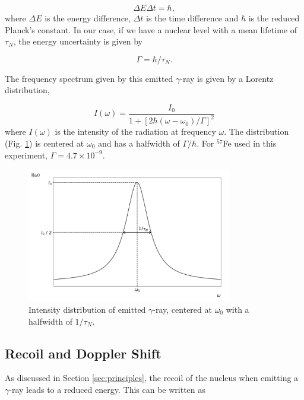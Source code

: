 \documentclass[a4paper]{report}
\numberwithin{equation}{section}
\begin{document}
\begin{equation}
		\Delta E \Delta t = \hbar,
\end{equation}
where $\Delta E $ is the energy difference, $\Delta t$ is the time difference and $\hbar $ is the reduced Planck's constant. In our case, if we have a nuclear level with a mean lifetime of $\tau _{N}$, the energy uncertainty is given by

\begin{equation}
		\Gamma = \hbar / \tau _{N}.	
\end{equation}

The frequency spectrum given by this emitted $\gamma$-ray is given by a Lorentz distribution, 

\begin{equation}
		I (\omega) = \frac{I_{0}}{1 + [2 \hbar (\omega - \omega_{0})/\Gamma]^2}
\end{equation}
where $I(\omega)$ is the intensity of the radiation at frequency $\omega$. The distribution (Fig. \ref{fig:lorentz}) is centered at $\omega_{0}$ and has a halfwidth of $\Gamma / \hbar $. For $^{57}$Fe used in this experiment, $\Gamma = 4.7 \times 10^{-9}$. 

\begin{figure}[htpb]
    \centering
    \includegraphics[width=0.8\textwidth]{lorentz}
    \caption{Intensity distribution of emitted $\gamma$-ray, centered at $\omega_{0}$ with a halfwidth of $1 / \tau _{N}$.}
    \label{fig:lorentz}
\end{figure}

\subsection{Recoil and Doppler Shift}

As discussed in Section \ref{sec:principles}, the recoil of the nucleus when emitting a $\gamma$-ray leads to a reduced energy. This can be written as
\end{document}
